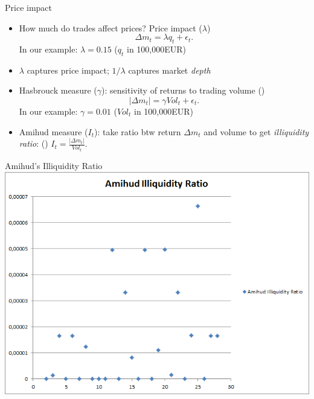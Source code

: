 \documentclass[english,10pt]{beamer}
\begin{document}
\begin{frame}{Price impact}
\begin{itemize}
	\item How much do trades affect prices? \alert{Price impact} ($\lambda$)
	\[
	\Delta m_t = \lambda q_t + \epsilon_t.
	\]
	In our example: $\lambda = 0.15 $ ($q_t$ in 100,000EUR)
	\item  $\lambda$ captures price impact;  $1/\lambda$ captures market \textit{depth}
	\item \alert{Hasbrouck measure} ($\gamma$): sensitivity of returns to trading volume (\citet{hasbrouck_empirical_2007})
	\[
	|\Delta m_t | = \gamma Vol_t + \epsilon_t.
	\]
	In our example: $\gamma = 0.01$ ($Vol_t$ in 100,000EUR)
	\item \alert{Amihud measure} ($I_t$): take ratio btw return $\Delta m_t$ and volume to get \textit{illiquidity ratio}: (\citet{amihud_illiquidity_2002})
	\center
	$I_t = \frac{|\Delta m_t|}{Vol_t}$.
\end{itemize}
\end{frame}


\begin{frame}{Amihud's Illiquidity Ratio}
\center
\includegraphics[scale=0.39]{pics/L2_Amihud}
\end{frame}
\end{document}
